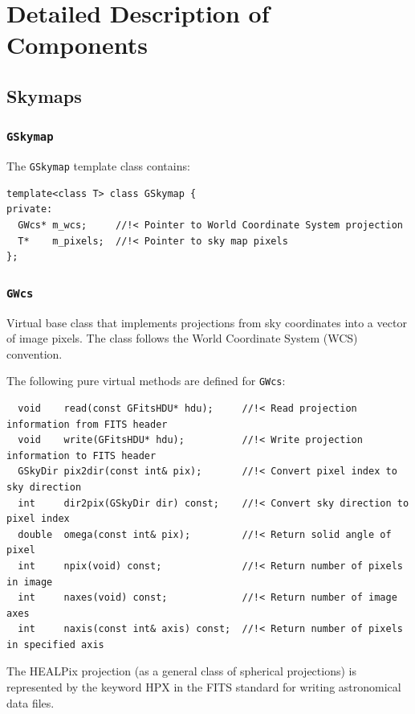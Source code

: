 \documentclass{article}[12pt,a4]
\begin{document}
\section{Detailed Description of Components}

\subsection{Skymaps}

\subsubsection{{\tt GSkymap}}

The {\tt GSkymap} template class contains:
\begin{verbatim}
template<class T> class GSkymap {
private:
  GWcs* m_wcs;     //!< Pointer to World Coordinate System projection
  T*    m_pixels;  //!< Pointer to sky map pixels
};
\end{verbatim}


\subsubsection{{\tt GWcs}}

Virtual base class that implements projections from sky coordinates into a vector of
image pixels.
The class follows the World Coordinate System (WCS) convention.

The following pure virtual methods are defined for {\tt GWcs}:
\begin{verbatim}
  void    read(const GFitsHDU* hdu);     //!< Read projection information from FITS header
  void    write(GFitsHDU* hdu);          //!< Write projection information to FITS header
  GSkyDir pix2dir(const int& pix);       //!< Convert pixel index to sky direction
  int     dir2pix(GSkyDir dir) const;    //!< Convert sky direction to pixel index
  double  omega(const int& pix);         //!< Return solid angle of pixel
  int     npix(void) const;              //!< Return number of pixels in image
  int     naxes(void) const;             //!< Return number of image axes
  int     naxis(const int& axis) const;  //!< Return number of pixels in specified axis
\end{verbatim}

The HEALPix projection (as a general class of spherical projections) is represented by the 
keyword HPX in the FITS standard for writing astronomical data files.
\end{document}
